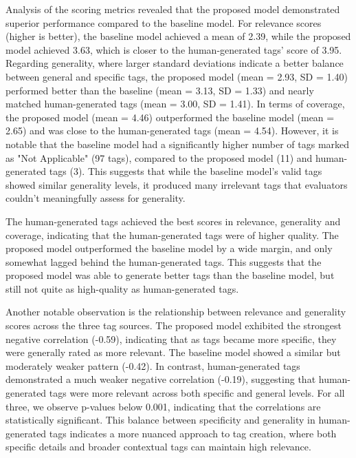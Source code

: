 Analysis of the scoring metrics revealed that the proposed model demonstrated superior performance compared to the baseline model. For relevance scores (higher is better), the baseline model achieved a mean of 2.39, while the proposed model achieved 3.63, which is closer to the human-generated tags' score of 3.95. Regarding generality, where larger standard deviations indicate a better balance between general and specific tags, the proposed model (mean = 2.93, SD = 1.40) performed better than the baseline (mean = 3.13, SD = 1.33) and nearly matched human-generated tags (mean = 3.00, SD = 1.41). In terms of coverage, the proposed model (mean = 4.46) outperformed the baseline model (mean = 2.65) and was close to the human-generated tags (mean = 4.54). However, it is notable that the baseline model had a significantly higher number of tags marked as "Not Applicable" (97 tags), compared to the proposed model (11) and human-generated tags (3). This suggests that while the baseline model's valid tags showed similar generality levels, it produced many irrelevant tags that evaluators couldn't meaningfully assess for generality.

The human-generated tags achieved the best scores in relevance, generality and coverage, indicating that the human-generated tags were of higher quality. The proposed model outperformed the baseline model by a wide margin, and only somewhat lagged behind the human-generated tags. This suggests that the proposed model was able to generate better tags than the baseline model, but still not quite as high-quality as human-generated tags.

Another notable observation is the relationship between relevance and generality scores across the three tag sources. The proposed model exhibited the strongest negative correlation (-0.59), indicating that as tags became more specific, they were generally rated as more relevant. The baseline model showed a similar but moderately weaker pattern (-0.42). In contrast, human-generated tags demonstrated a much weaker negative correlation (-0.19), suggesting that human-generated tags were more relevant across both specific and general levels. For all three, we observe p-values below 0.001, indicating that the correlations are statistically significant. This balance between specificity and generality in human-generated tags indicates a more nuanced approach to tag creation, where both specific details and broader contextual tags can maintain high relevance.

